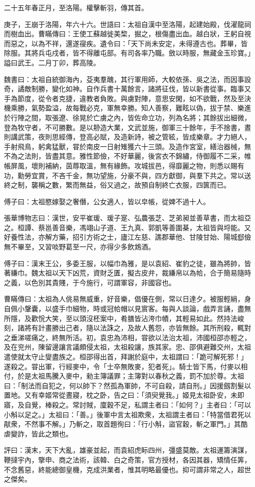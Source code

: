 \begin{pinyinscope}
二十五年春正月，至洛陽。權擊斬羽，傳其首。

庚子，王崩于洛陽，年六十六。世語曰：太祖自漢中至洛陽，起建始殿，伐濯龍祠而樹血出。曹瞞傳曰：王使工蘇越徙美棃，掘之，根傷盡出血。越白狀，王躬自視而惡之，以為不祥，還遂寑疾。遺令曰：「天下尚未安定，未得遵古也。葬畢，皆除服。其將兵屯戍者，皆不得離屯部。有司各率乃職。斂以時服，無藏金玉珍寶。」謚曰武王。二月丁卯，葬高陵。

魏書曰：太祖自統御海內，芟夷羣醜，其行軍用師，大較依孫、吳之法，而因事設奇，譎敵制勝，變化如神。自作兵書十萬餘言，諸將征伐，皆以新書從事。臨事又手為節度，從令者克捷，違教者負敗。與虜對陣，意思安閑，如不欲戰，然及至決機乘勝，氣勢盈溢，故每戰必克，軍無幸勝。知人善察，難眩以偽，拔于禁、樂進於行陣之間，取張遼、徐晃於亡虜之內，皆佐命立功，列為名將；其餘拔出細微，登為牧守者，不可勝數。是以刱造大業，文武並施，御軍三十餘年，手不捨書，晝則講武策，夜則思經傳，登高必賦，及造新詩，被之管絃，皆成樂章。才力絕人，手射飛鳥，躬禽猛獸，甞於南皮一日射雉獲六十三頭。及造作宮室，繕治器械，無不為之法則，皆盡其意。雅性節儉，不好華麗，後宮衣不錦繡，侍御履不二采，帷帳屏風，壞則補納，茵蓐取溫，無有緣飾。攻城拔邑，得靡麗之物，則悉以賜有功，勳勞宜賞，不吝千金，無功望施，分豪不與，四方獻御，與羣下共之。常以送終之制，襲稱之數，繁而無益，俗又過之，故預自制終亡衣服，四篋而已。

傅子曰：太祖愍嫁娶之奢僭，公女適人，皆以皁帳，從婢不過十人。

張華博物志曰：漢世，安平崔瑗、瑗子寔、弘農張芝、芝弟昶並善草書，而太祖亞之。桓譚、蔡邕善音樂，馮翊山子道、王九真、郭凱等善圍棊，太祖皆與埒能。又好養性法，亦解方藥，招引方術之士，廬江左慈、譙郡華他、甘陵甘始、陽城郄儉無不畢至，又習啖野葛至一尺，亦得少多飲鴆酒。

傅子曰：漢末王公，多委王服，以幅巾為雅，是以袁紹、崔豹之徒，雖為將帥，皆著縑巾。魏太祖以天下凶荒，資財乏匱，擬古皮弁，裁縑帛以為帢，合于簡易隨時之義，以色別其貴賤，于今施行，可謂軍容，非國容也。

曹瞞傳曰：太祖為人佻易無威重，好音樂，倡優在側，常以日達夕。被服輕綃，身自佩小鞶囊，以盛手巾細物，時或冠帢帽以見賔客。每與人談論，戲弄言誦，盡無所隱，及歡恱大笑，至以頭沒柸案中，肴膳皆沾洿巾幘，其輕易如此。然持法峻刻，諸將有計畫勝出己者，隨以法誅之，及故人舊怨，亦皆無餘。其所刑殺，輒對之垂涕嗟痛之，終無所活。初，袁忠為沛相，甞欲以法治太祖，沛國桓邵亦輕之，及在兖州，陳留邊讓言議頗侵太祖，太祖殺讓，族其家。忠、邵俱避難交州，太祖遣使就太守止燮盡族之。桓邵得出首，拜謝於庭中，太祖謂曰：「跪可解死邪！」遂殺之。甞出軍，行經麥中，令「士卒無敗麥，犯者死」。騎士皆下馬，付麥以相付，於是太祖馬騰入麥中，勑主簿議罪；主簿對以春秋之義，罰不加於尊。太祖曰：「制法而自犯之，何以帥下？然孤為軍帥，不可自殺，請自刑。」因援劔割髮以置地。又有幸姬常從晝寢，枕之卧，告之曰：「須臾覺我。」姬見太祖卧安，未即寤，及自覺，棒殺之。常討賊，廩穀不足，私謂主者曰：「如何？」主者曰：「可以小斛以足之。」太祖曰：「善。」後軍中言太祖欺衆，太祖謂主者曰：「特當借君死以猒衆，不然事不解。」乃斬之，取首題徇曰：「行小斛，盜官穀，斬之軍門。」其酷虐變詐，皆此之類也。

評曰：漢末，天下大亂，雄豪並起，而袁紹虎眎四州，彊盛莫敵。太祖運籌演謀，鞭撻宇內，擥申、商之法術，該韓、白之奇策，官方授材，各因其器，矯情任筭，不念舊惡，終能總御皇機，克成洪業者，惟其明略最優也。抑可謂非常之人，超世之傑矣。


\end{pinyinscope}